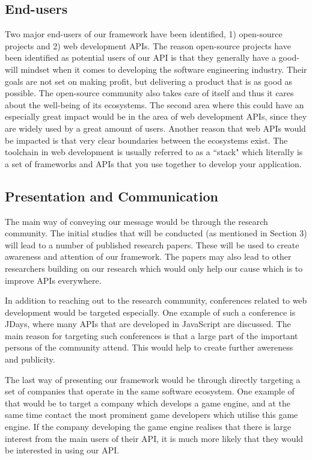 \documentclass{article}
\begin{document}
\subsection{End-users}

Two major end-users of our framework have been identified, 1) open-source projects and 2) web development APIs. The reason open-source projects have been identified as potential users of our API is that they generally have a good-will mindset when it comes to developing the software engineering industry. Their goals are not set on making profit, but delivering a product that is as good as possible. The open-source community also takes care of itself and thus it cares about the well-being of its ecosystems. The second area where this could have an especially great impact would be in the area of web development APIs, since they are widely used by a great amount of users. Another reason that web APIs would be impacted is that very clear boundaries between the ecosystems exist. The toolchain in web development is usually referred to as a ``stack" which literally is a set of frameworks and APIs that you use together to develop your application. 

\subsection{Presentation and Communication}
The main way of conveying our message would be through the research community. The initial studies that will be conducted (as mentioned in Section 3) will lead to a number of published research papers. These will be used to create awareness and attention of our framework. The papers may also lead to other researchers building on our research which would only help our cause which is to improve APIs everywhere. 

In addition to reaching out to the research community, conferences related to web development would be targeted especially. One example of such a conference is JDays, where many APIs that are developed in JavaScript are discussed. The main reason for targeting such conferences is that a large part of the important persons of the community attend. This would help to create further awereness and publicity. 

The last way of presenting our framework would be through directly targeting a set of companies that operate in the same software ecosystem. One example of that would be to target a company which develops a game engine, and at the same time contact the most prominent game developers which utilise this game engine. If the company developing the game engine realises that there is large interest from the main users of their API, it is much more likely that they would be interested in using our API. 
\end{document}
